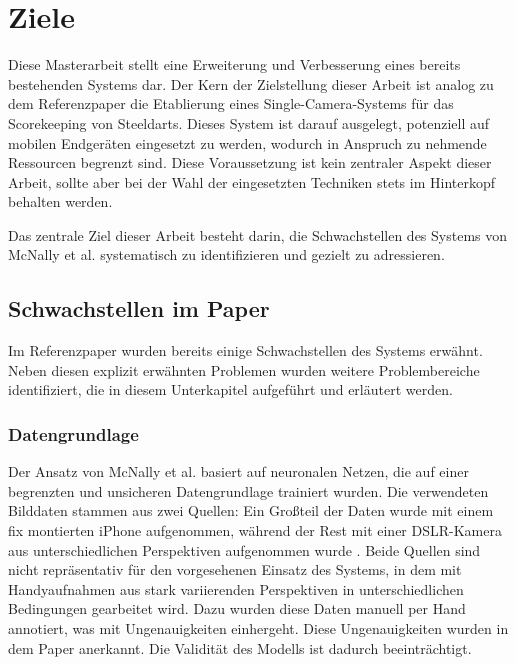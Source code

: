 \section{Ziele}
\label{sec:ziele}

Diese Masterarbeit stellt eine Erweiterung und Verbesserung eines bereits bestehenden Systems dar. Der Kern der Zielstellung dieser Arbeit ist analog zu dem Referenzpaper die Etablierung eines Single-Camera-Systems für das Scorekeeping von Steeldarts. Dieses System ist darauf ausgelegt, potenziell auf mobilen Endgeräten eingesetzt zu werden, wodurch in Anspruch zu nehmende Ressourcen begrenzt sind. Diese Voraussetzung ist kein zentraler Aspekt dieser Arbeit, sollte aber bei der Wahl der eingesetzten Techniken stets im Hinterkopf behalten werden.

Das zentrale Ziel dieser Arbeit besteht darin, die Schwachstellen des Systems von McNally et al. systematisch zu identifizieren und gezielt zu adressieren.

\subsection{Schwachstellen im Paper}
\label{sub:schwachstellen}

Im Referenzpaper wurden bereits einige Schwachstellen des Systems erwähnt. Neben diesen explizit erwähnten Problemen wurden weitere Problembereiche identifiziert, die in diesem Unterkapitel aufgeführt und erläutert werden.

\subsubsection{Datengrundlage}
\label{sec:ziele:schwachstellen:datengrundlage}

Der Ansatz von McNally et al. basiert auf neuronalen Netzen, die auf einer begrenzten und unsicheren Datengrundlage trainiert wurden. Die verwendeten Bilddaten stammen aus zwei Quellen: Ein Großteil der Daten wurde mit einem fix montierten iPhone aufgenommen, während der Rest mit einer DSLR-Kamera aus unterschiedlichen Perspektiven aufgenommen wurde \cite{deepdarts-data}. Beide Quellen sind nicht repräsentativ für den vorgesehenen Einsatz des Systems, in dem mit Handyaufnahmen aus stark variierenden Perspektiven in unterschiedlichen Bedingungen gearbeitet wird. Dazu wurden diese Daten manuell per Hand annotiert, was mit Ungenauigkeiten einhergeht. Diese Ungenauigkeiten wurden in dem Paper anerkannt. Die Validität des Modells ist dadurch beeinträchtigt.

